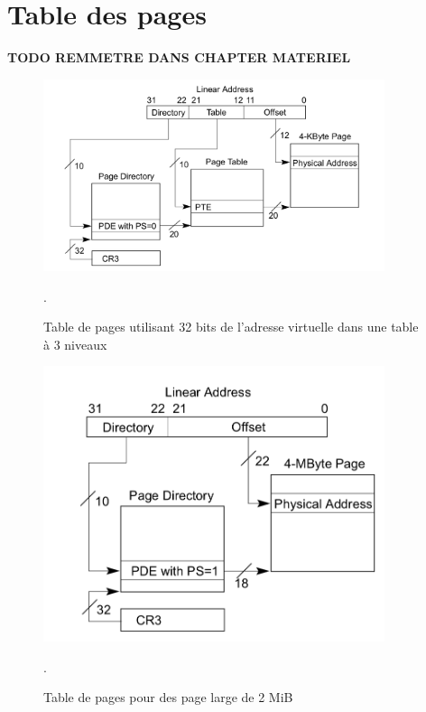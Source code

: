 \chapter{Table des pages}
\label{annexe:memory_page_table}


\textbf{TODO REMMETRE DANS CHAPTER MATERIEL}
\begin{figure}[H]
    \center
    \includegraphics[width=10cm]{images/memory_page_table_32bits.png}
    \caption{\label{pic:memory_page_table_32bits} Table de pages utilisant 32 bits de l'adresse virtuelle dans une table à 3 niveaux \cite{intel64and}}.
\end{figure}

\begin{figure}
    \center
    \includegraphics[width=10cm]{images/memory_page_table_32bits_large.png}
    \caption{\label{pic:memory_page_table_32bits_large} Table de pages pour des page large de 2 MiB\cite{intel64and}}.
\end{figure}


